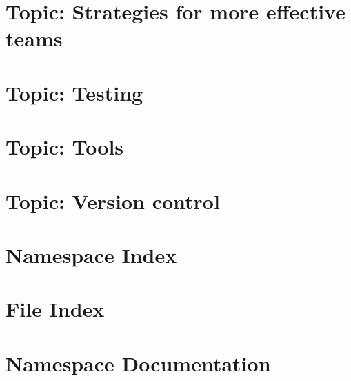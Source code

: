 \documentclass[twoside]{book}
\newcommand{\+}{\discretionary{\mbox{\scriptsize$\hookleftarrow$}}{}{}}
\begin{document}
\chapter{Topic\+: Strategies for more effective teams}
\label{md_markdown_topic_stategies_for_more_effective_teams}

\chapter{Topic\+: Testing}
\label{md_markdown_topic_testing}

\chapter{Topic\+: Tools}
\label{md_markdown_topic_tools}

\chapter{Topic\+: Version control}
\label{md_markdown_topic_version_control}

\chapter{Namespace Index}

\chapter{File Index}

\chapter{Namespace Documentation}

\end{document}
